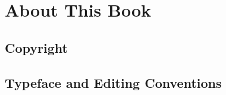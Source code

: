 \chapter{About This Book}




\section*{Copyright}




\section*{Typeface and Editing Conventions}





